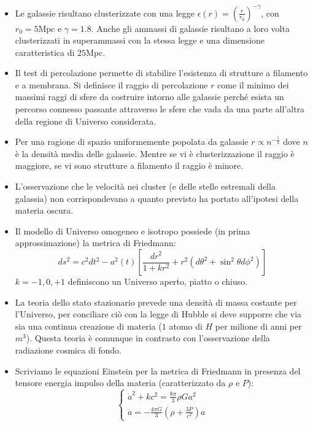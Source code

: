 \documentclass[11pt,a4paper]{article}
\begin{document}
\begin{itemize}
\item Le galassie risultano clusterizzate con una legge $\epsilon (r) = \left( \frac{r}{r_0} \right) ^ {-\gamma}$, con $r_0 = 5 \text{Mpc}$ e $\gamma = 1.8$. Anche gli ammassi di galassie risultano a loro volta clusterizzati in superammassi con la stessa legge e una dimensione caratteristica di $25$Mpc.

\item Il test di percolazione permette di stabilire l'esistenza di strutture a filamento e a membrana.
Si definisce il raggio di percolazione $r$ come il minimo dei massimi raggi di sfere da costruire intorno alle galassie perché esista un percorso connesso passante attraverso le sfere che vada da una parte all'altra della regione di Universo considerata.

\item Per una ragione di spazio uniformemente popolata da galassie $r \propto n^{-\frac{1}{3}}$ dove $n$ è la densità media delle galassie. Mentre se vi è clusterizzazione il raggio è maggiore, se vi sono strutture a filamento il raggio è minore.

\item L'osservazione che le velocità nei cluster (e delle stelle estremali della galassia) non corrispondevano a quanto previsto ha portato all'ipotesi della materia oscura.

\item Il modello di Universo omogeneo e isotropo possiede (in prima approssimazione) la metrica di Friedmann:
\begin{equation}
ds^2 = c^2 dt^2 - a^2(t) \left[ \frac{dr^2}{1+k r^2}+ r^2 \left( d\theta^2 + \sin^2 \theta d\phi^2 \right) \right]
\end{equation}
$k=-1,0,+1$ definiscono un Universo aperto, piatto o chiuso.

\item La teoria dello stato stazionario prevede una densità di massa costante per l'Universo, per conciliare ciò con la legge di Hubble si deve supporre che via sia una continua creazione di materia ($1$ atomo di $H$ per milione di anni per $m^3$). Questa teoria è comunque in contrasto con l'osservazione della radiazione cosmica di fondo.

\item Scriviamo le equazioni Einstein per la metrica di Friedmann in presenza del tensore energia impulso della materia (caratterizzato da $\rho$ e $P$):
\begin{equation}
\begin{cases}
\dot{a}^{2} + k c^2 = \frac{8 \pi}{3} \rho G a^2 \\
\ddot{a} = -\frac{4 \pi G}{3} \left( \rho + \frac{3P}{c^2} \right) a 
\end{cases}
\end{equation}


\end{itemize}
\end{document}

